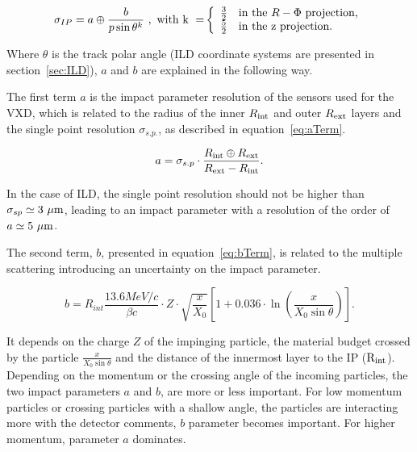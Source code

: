     \begin{equation}
      \sigma_{IP} = a \oplus \frac{b}{p \sin{\theta}^{k}}~\rm{,~with~k~=}
      \left\{
        \begin{array}{r l}
          \frac{3}{2} & \text{in the } R - \Phi \text{ projection,} \\
          \frac{5}{2} & \text{in the z projection.}
        \end{array}
      \right. 
      \label{eq:resIP}
    \end{equation}

    Where $\theta$ is the track polar angle (\gls{ILD} coordinate systems are presented in section~\ref{sec:ILD}), $a$ and $b$ are explained in the following way.

   The first term $a$ is the impact parameter resolution of the sensors used for the \gls{VXD}, which is related to the radius of the inner $R_{\rm{int}}$ and outer $R_{\rm{ext}}$ layers and the single point resolution $\sigma_{s.p.}$, as described in equation~\ref{eq:aTerm}.

   \begin{equation}
     a = \sigma_{s.p} \cdot \frac{R_{\rm{int}} \oplus R_{\rm{ext}}}{R_{\rm{ext}} - R_{\rm{int}}}.
     \label{eq:aTerm}
   \end{equation}

  In the case of \gls{ILD}, the single point resolution should not be higher than $\sigma_{sp} \simeq 3~\rm{\mu m}$, leading to an impact parameter with a resolution of the order of $a \simeq 5~\rm{\mu m}$.
  
  The second term, $b$, presented in equation~\ref{eq:bTerm}, is related to the multiple scattering introducing an uncertainty on the impact parameter.
  
  \begin{equation}
    b = R_{int} \frac{13.6 MeV/c}{\beta c} \cdot Z \cdot \sqrt{\frac{x}{X_{0}}} \left[ 1 + 0.036 \cdot \ln{ \left( \frac{x}{X_{0}\sin{\theta}} \right)} \right].
    \label{eq:bTerm}
  \end{equation}

  It depends on the charge $Z$ of the impinging particle, the material budget crossed by the particle $\frac{x}{X_0 \sin{\theta}}$ and the distance of the innermost layer to the \gls{IP} ($\rm{R_{int}}$).
  Depending on the momentum or the crossing angle of the incoming particles, the two impact parameters $a$ and $b$, are more or less important.
  For low momentum particles or crossing particles with a shallow angle, the particles are interacting more with the detector comments, $b$ parameter becomes important.
  For higher momentum, parameter $a$ dominates.
    
